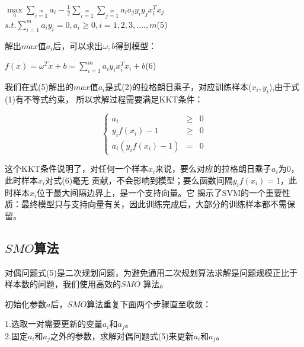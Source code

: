 \documentclass[UTF8]{ctexart}
\begin{document}
{\begin{center}
    \Large{
        $\max\limits_a\sum\limits_{i=1}\limits^ma_i-\frac{1}{2}\sum\limits_{i=1}\limits^m\sum\limits_{j=1}\limits^ma_ia_jy_iy_jx_i^Tx_j$\\[2ex]
        $s.t.\sum\limits_{i=1}^ma_iy_i=0,a_i\geq0,i=1,2,3,....,m$\quad(5)
    }
\end{center}\par
解出$max$值$a_i$后，可以求出$\omega,b$得到模型：\par
\begin{center}
    \Large{
        $f(x)=\omega^Tx+b=\sum\limits_{i=1}^ma_iy_ix_i^Tx_i+b$\quad(6)
    }
\end{center}\par
我们在式(5)解出的$max$值$a_i$是式(2)的拉格朗日乘子，对应训练样本($x_i,y_i$),由于式(1)有不等式约束，
所以求解过程需要满足KKT条件：\par
$$ \left\{
\begin{aligned}
    a_i & \geq & 0 \\
    y_if(x_i)-1 & \geq & 0 \\
    a_i(y_if(x_i)-1) & = & 0
\end{aligned}
\right.
$$\par
这个KKT条件说明了，对任何一个样本$x_i$来说，要么对应的拉格朗日乘子$a_i$为0，此时样本$x_i$对式(6)毫无
贡献，不会影响到模型；要么函数间隔$y_if(x_i)=1$，此时样本$x_i$位于最大间隔边界上，是一个支持向量。它
揭示了SVM的一个重要性质：最终模型只与支持向量有关，因此训练完成后，大部分的训练样本都不需保留。
\subsection{$SMO$算法}
对偶问题式(5)是二次规划问题，为避免通用二次规划算法求解是问题规模正比于样本数的问题，我们使用高效的$SMO$
算法。\par
初始化参数$a$后，$SMO$算法重复下面两个步骤直至收敛：\par
\begin{center}
    1.选取一对需要更新的变量$a_i$和$a_j$。\phantom{更更更更更更更更更更aaaa}\\
    2.固定$a_i$和$a_j$之外的参数，求解对偶问题式(5)来更新$a_i$和$a_j$。
\end{center}\par
}
\end{document}
